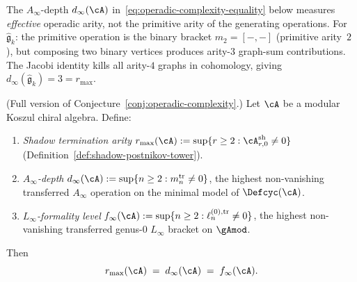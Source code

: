 \begin{remark}
\label{rem:effective-vs-primitive-arity}
The $A_\infty$-depth $d_\infty(\cA)$
in~\eqref{eq:operadic-complexity-equality} below
measures \emph{effective} operadic arity, not the
primitive arity of the generating operations.
For $\hat{\mathfrak{g}}_k$: the primitive operation is
the binary bracket $m_2 = [-,-]$ (primitive arity~$2$),
but composing two binary vertices produces arity-$3$
graph-sum contributions.  The Jacobi identity kills
all arity-$4$ graphs in cohomology, giving
$d_\infty(\hat{\mathfrak{g}}_k) = 3 = r_{\max}$.
\end{remark}

\begin{conjecture}
\label{conj:operadic-complexity-detailed}
\ClaimStatusConjectured
{}
\textup{(}Full version of
Conjecture~\textup{\ref{conj:operadic-complexity}}.\textup{)}
Let $\cA$ be a modular Koszul chiral algebra.  Define:
\begin{enumerate}[label=\textup{(\arabic*)}]
\item \emph{Shadow termination arity}\;
  $r_{\max}(\cA) := \sup\{r \geq 2 :
  \cA^{\mathrm{sh}}_{r,0} \neq 0\}$
  \textup{(}Definition~\textup{\ref{def:shadow-postnikov-tower})}.
\item \emph{$A_\infty$-depth}\;
  $d_\infty(\cA) := \sup\{n \geq 2 :
  m_n^{\mathrm{tr}} \neq 0\}$,
  the highest non-vanishing transferred $A_\infty$
  operation on the minimal model of $\Defcyc(\cA)$.
\item \emph{$L_\infty$-formality level}\;
  $f_\infty(\cA) := \sup\{n \geq 2 :
  \ell_n^{(0),\mathrm{tr}} \neq 0\}$,
  the highest non-vanishing transferred genus-$0$
  $L_\infty$ bracket on $\gAmod$.
\end{enumerate}
Then
\begin{equation}
\label{eq:operadic-complexity-equality}
r_{\max}(\cA)
\;=\;
d_\infty(\cA)
\;=\;
f_\infty(\cA).
\end{equation}
\end{conjecture}

